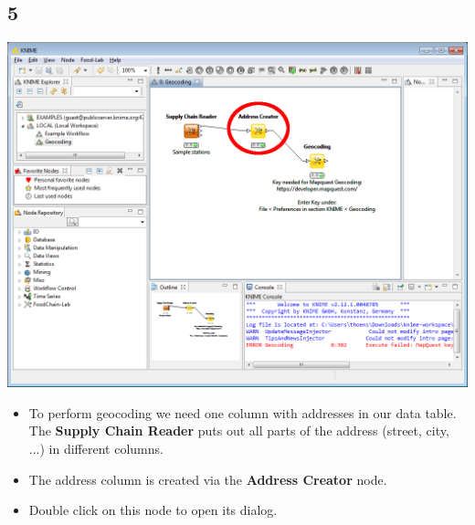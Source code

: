 \documentclass{beamer}
\begin{document}
\subsection{5}
\begin{frame}
	\begin{center}
  		\includegraphics[height=0.6\textheight]{5.png}
	\end{center}
	\begin{itemize}
		\item To perform geocoding we need one column with addresses in our data table. The \textbf{Supply Chain Reader} puts out all parts of the address (street, city, ...) in different columns.
		\item The address column is created via the \textbf{Address Creator} node.
		\item Double click on this node to open its dialog.
	\end{itemize}
\end{frame}
\end{document}
